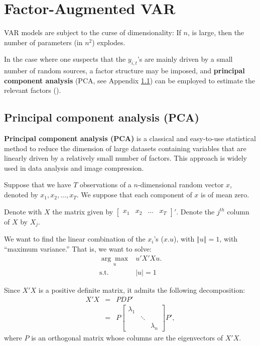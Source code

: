 \documentclass[
  12pt,
]{book}
\theoremstyle{definition}
\theoremstyle{definition}
\theoremstyle{definition}
\theoremstyle{definition}
\theoremstyle{remark}
\begin{document}
\hypertarget{FAVAR}{%
\chapter{Factor-Augmented VAR}\label{FAVAR}}

VAR models are subject to the curse of dimensionality: If \(n\), is large, then the number of parameters (in \(n^2\)) explodes.

In the case where one suspects that the \(y_{i,t}\)'s are mainly driven by a small number of random sources, a factor structure may be imposed, and \textbf{principal component analysis} (PCA, see Appendix \ref{PCAapp}) can be employed to estimate the relevant factors (\citet{Bernanke_Boivin_Eliasz_2005}).

\hypertarget{PCAapp}{%
\section{Principal component analysis (PCA)}\label{PCAapp}}

\textbf{Principal component analysis (PCA)} is a classical and easy-to-use statistical method to reduce the dimension of large datasets containing variables that are linearly driven by a relatively small number of factors. This approach is widely used in data analysis and image compression.

Suppose that we have \(T\) observations of a \(n\)-dimensional random vector \(x\), denoted by \(x_{1},x_{2},\ldots,x_{T}\). We suppose that each component of \(x\) is of mean zero.

Denote with \(X\) the matrix given by \(\left[\begin{array}{cccc} x_{1} & x_{2} & \ldots & x_{T}\end{array}\right]'\). Denote the \(j^{th}\) column of \(X\) by \(X_{j}\).

We want to find the linear combination of the \(x_{i}\)'s (\(x.u\)), with \(\left\Vert u\right\Vert =1\), with ``maximum variance.'' That is, we want to solve:
\begin{equation}
\begin{array}{clll}
\underset{u}{\arg\max} & u'X'Xu. \\
\mbox{s.t. } & \left| u\right| =1
\end{array}\label{eq:PCA11}
\end{equation}

Since \(X'X\) is a positive definite matrix, it admits the following decomposition:
\begin{eqnarray*}
X'X & = & PDP'\\
& = & P\left[\begin{array}{ccc}
\lambda_{1}\\
& \ddots\\
&  & \lambda_{n}
\end{array}\right]P',
\end{eqnarray*}
where \(P\) is an orthogonal matrix whose columns are the eigenvectors of \(X'X\).
\end{document}
